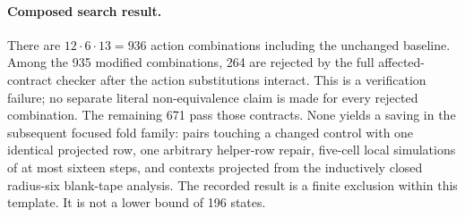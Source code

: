 \paragraph{Composed search result.}
There are $12\cdot6\cdot13=936$ action combinations including the unchanged
baseline. Among the 935 modified combinations, 264 are rejected by the full affected-contract checker after the action
substitutions interact. This is a verification failure; no separate literal
non-equivalence claim is made for every rejected combination. The remaining
671 pass those contracts. None yields a saving in the subsequent focused
fold family: pairs touching a changed control with one identical projected
row, one arbitrary helper-row repair, five-cell local simulations of at
most sixteen steps, and contexts projected from the inductively closed
radius-six blank-tape analysis. The recorded result is a finite exclusion
within this template. It is not a lower bound of 196 states.
